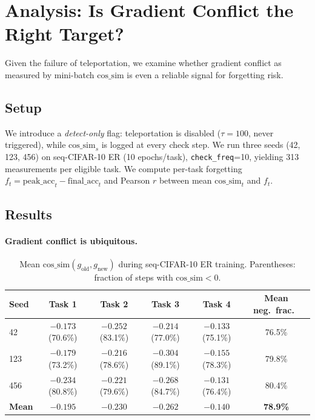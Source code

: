 \documentclass{article}
\newcommand{\cossim}{\mathrm{cos\_sim}}
\begin{document}
\section{Analysis: Is Gradient Conflict the Right Target?}
\label{sec:h8}

Given the failure of teleportation, we examine whether gradient conflict as measured
by mini-batch $\cossim$ is even a reliable signal for forgetting risk.

\subsection{Setup}

We introduce a \emph{detect-only} flag: teleportation is disabled ($\tau = 100$,
never triggered), while $\cossim_s$ is logged at every check step.
We run three seeds (42, 123, 456) on seq-CIFAR-10 ER (10 epochs/task),
\texttt{check\_freq}=10, yielding 313 measurements per eligible task.
We compute per-task forgetting $f_t = \mathrm{peak\_acc}_t - \mathrm{final\_acc}_t$
and Pearson $r$ between mean $\cossim_t$ and $f_t$.

\subsection{Results}

\paragraph{Gradient conflict is ubiquitous.}

\begin{table}[t]
\centering
\caption{Mean $\cossim(g_\mathrm{old}, g_\mathrm{new})$ during seq-CIFAR-10 ER training.
         Parentheses: fraction of steps with $\cossim < 0$.}
\label{tab:h8_cossim}
\begin{tabular}{lccccc}
\toprule
Seed & Task 1 & Task 2 & Task 3 & Task 4 & Mean neg.\ frac.\ \\
\midrule
42  & $-0.173$ (70.6\%) & $-0.252$ (83.1\%) & $-0.214$ (77.0\%) & $-0.133$ (75.1\%) & 76.5\% \\
123 & $-0.179$ (73.2\%) & $-0.216$ (78.6\%) & $-0.304$ (89.1\%) & $-0.155$ (78.3\%) & 79.8\% \\
456 & $-0.234$ (80.8\%) & $-0.221$ (79.6\%) & $-0.268$ (84.7\%) & $-0.131$ (76.4\%) & 80.4\% \\
\midrule
\textbf{Mean} & $\mathbf{-0.195}$ & $\mathbf{-0.230}$ & $\mathbf{-0.262}$ & $\mathbf{-0.140}$ & \textbf{78.9\%} \\
\bottomrule
\end{tabular}
\end{table}
\end{document}
